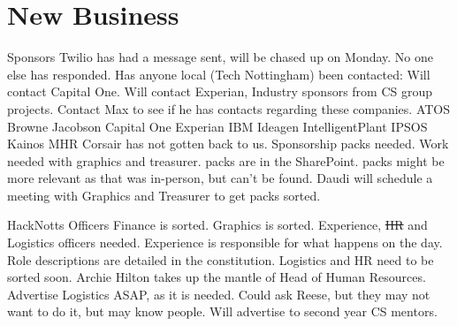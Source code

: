 \documentclass[11pt,hacksoc,agenda]{meetingmins}
\begin{document}
\maketitle

\section{New Business}
\begin{items}
  \item Sponsors
  \subitem Twilio has had a message sent, will be chased up on Monday.
  \subitem No one else has responded.
  \subitem Has anyone local (Tech Nottingham) been contacted:
  \subitem Will contact Capital One.
  \subitem Will contact Experian,
  \subitem Industry sponsors from CS group projects.
  \subitem Contact Max to see if he has contacts regarding these companies.
  \subsubitem ATOS
  \subsubitem Browne Jacobson
  \subsubitem Capital One
  \subsubitem Experian
  \subsubitem IBM
  \subsubitem Ideagen
  \subsubitem IntelligentPlant
  \subsubitem IPSOS
  \subsubitem Kainos
  \subsubitem MHR
  \subitem Corsair has not gotten back to us.
  \subitem Sponsorship packs needed.
  \subsubitem Work needed with graphics and treasurer.
   packs are in the SharePoint.
   packs might be more relevant as that was in-person, but can't be found.
  \subsubitem Daudi will schedule a meeting with Graphics and Treasurer to get packs sorted.

  \item HackNotts Officers
  \subitem Finance is sorted.
  \subitem Graphics is sorted.
  \subitem Experience, \sout{HR} and Logistics officers needed.
  \subitem Experience is responsible for what happens on the day.
  \subitem Role descriptions are detailed in the constitution.
  \subitem Logistics and HR need to be sorted soon.
  \subitem Archie Hilton takes up the mantle of Head of Human Resources.
  \subitem Advertise Logistics ASAP, as it is needed.
  \subsubitem Could ask Reese, but they may not want to do it, but may know people.
  \subitem Will advertise to second year CS mentors.


\end{items}
\end{document}
